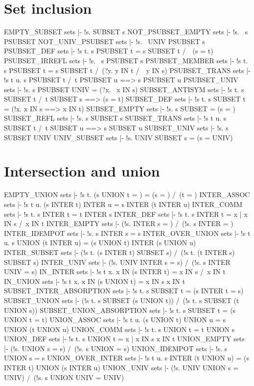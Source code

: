 \section{Set inclusion}
\THEOREM EMPTY\_SUBSET sets
|- !s. {} SUBSET s
\ENDTHEOREM
\THEOREM NOT\_PSUBSET\_EMPTY sets
|- !s. ~s PSUBSET {}
\ENDTHEOREM
\THEOREM NOT\_UNIV\_PSUBSET sets
|- !s. ~UNIV PSUBSET s
\ENDTHEOREM
\THEOREM PSUBSET\_DEF sets
|- !s t. s PSUBSET t = s SUBSET t /\ ~(s = t)
\ENDTHEOREM
\THEOREM PSUBSET\_IRREFL sets
|- !s. ~s PSUBSET s
\ENDTHEOREM
\THEOREM PSUBSET\_MEMBER sets
|- !s t. s PSUBSET t = s SUBSET t /\ (?y. y IN t /\ ~y IN s)
\ENDTHEOREM
\THEOREM PSUBSET\_TRANS sets
|- !s t u. s PSUBSET t /\ t PSUBSET u ==> s PSUBSET u
\ENDTHEOREM
\THEOREM PSUBSET\_UNIV sets
|- !s. s PSUBSET UNIV = (?x. ~x IN s)
\ENDTHEOREM
\THEOREM SUBSET\_ANTISYM sets
|- !s t. s SUBSET t /\ t SUBSET s ==> (s = t)
\ENDTHEOREM
\THEOREM SUBSET\_DEF sets
|- !s t. s SUBSET t = (!x. x IN s ==> x IN t)
\ENDTHEOREM
\THEOREM SUBSET\_EMPTY sets
|- !s. s SUBSET {} = (s = {})
\ENDTHEOREM
\THEOREM SUBSET\_REFL sets
|- !s. s SUBSET s
\ENDTHEOREM
\THEOREM SUBSET\_TRANS sets
|- !s t u. s SUBSET t /\ t SUBSET u ==> s SUBSET u
\ENDTHEOREM
\THEOREM SUBSET\_UNIV sets
|- !s. s SUBSET UNIV
\ENDTHEOREM
\THEOREM UNIV\_SUBSET sets
|- !s. UNIV SUBSET s = (s = UNIV)
\ENDTHEOREM
\section{Intersection and union}
\THEOREM EMPTY\_UNION sets
|- !s t. (s UNION t = {}) = (s = {}) /\ (t = {})
\ENDTHEOREM
\THEOREM INTER\_ASSOC sets
|- !s t u. (s INTER t) INTER u = s INTER (t INTER u)
\ENDTHEOREM
\THEOREM INTER\_COMM sets
|- !s t. s INTER t = t INTER s
\ENDTHEOREM
\THEOREM INTER\_DEF sets
|- !s t. s INTER t = {x | x IN s /\ x IN t}
\ENDTHEOREM
\THEOREM INTER\_EMPTY sets
|- (!s. {} INTER s = {}) /\ (!s. s INTER {} = {})
\ENDTHEOREM
\THEOREM INTER\_IDEMPOT sets
|- !s. s INTER s = s
\ENDTHEOREM
\THEOREM INTER\_OVER\_UNION sets
|- !s t u. s UNION (t INTER u) = (s UNION t) INTER (s UNION u)
\ENDTHEOREM
\THEOREM INTER\_SUBSET sets
|- (!s t. (s INTER t) SUBSET s) /\ (!s t. (t INTER s) SUBSET s)
\ENDTHEOREM
\THEOREM INTER\_UNIV sets
|- (!s. UNIV INTER s = s) /\ (!s. s INTER UNIV = s)
\ENDTHEOREM
\THEOREM IN\_INTER sets
|- !s t x. x IN (s INTER t) = x IN s /\ x IN t
\ENDTHEOREM
\THEOREM IN\_UNION sets
|- !s t x. x IN (s UNION t) = x IN s \/ x IN t
\ENDTHEOREM
\THEOREM SUBSET\_INTER\_ABSORPTION sets
|- !s t. s SUBSET t = (s INTER t = s)
\ENDTHEOREM
\THEOREM SUBSET\_UNION sets
|- (!s t. s SUBSET (s UNION t)) /\ (!s t. s SUBSET (t UNION s))
\ENDTHEOREM
\THEOREM SUBSET\_UNION\_ABSORPTION sets
|- !s t. s SUBSET t = (s UNION t = t)
\ENDTHEOREM
\THEOREM UNION\_ASSOC sets
|- !s t u. (s UNION t) UNION u = s UNION (t UNION u)
\ENDTHEOREM
\THEOREM UNION\_COMM sets
|- !s t. s UNION t = t UNION s
\ENDTHEOREM
\THEOREM UNION\_DEF sets
|- !s t. s UNION t = {x | x IN s \/ x IN t}
\ENDTHEOREM
\THEOREM UNION\_EMPTY sets
|- (!s. {} UNION s = s) /\ (!s. s UNION {} = s)
\ENDTHEOREM
\THEOREM UNION\_IDEMPOT sets
|- !s. s UNION s = s
\ENDTHEOREM
\THEOREM UNION\_OVER\_INTER sets
|- !s t u. s INTER (t UNION u) = (s INTER t) UNION (s INTER u)
\ENDTHEOREM
\THEOREM UNION\_UNIV sets
|- (!s. UNIV UNION s = UNIV) /\ (!s. s UNION UNIV = UNIV)
\ENDTHEOREM
